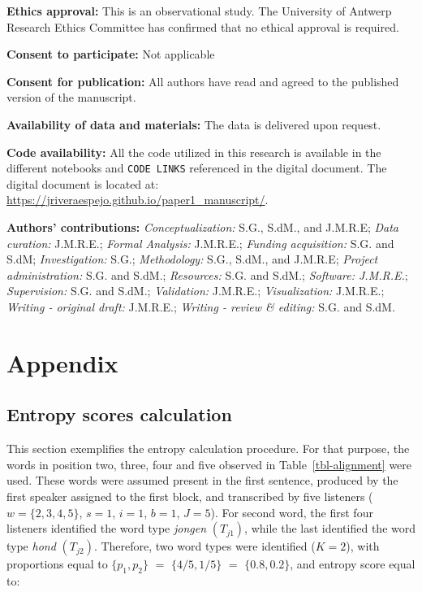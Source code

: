 \documentclass[
  authoryear,
  preprint,
  1p]{elsarticle}
\begin{document}
\textbf{Ethics approval:} This is an observational study. The University
of Antwerp Research Ethics Committee has confirmed that no ethical
approval is required.

\textbf{Consent to participate:} Not applicable

\textbf{Consent for publication:} All authors have read and agreed to
the published version of the manuscript.

\textbf{Availability of data and materials:} {The data is delivered upon
request.}

\textbf{Code availability:} {All the code utilized in this research is
available in the different notebooks and \texttt{CODE\ LINKS} referenced
in the digital document. The digital document is located at:}
\url{https://jriveraespejo.github.io/paper1_manuscript/}.

\textbf{Authors' contributions:} \emph{Conceptualization:} S.G., S.dM.,
and J.M.R.E; \emph{Data curation:} J.M.R.E.; \emph{Formal Analysis:}
J.M.R.E.; \emph{Funding acquisition:} S.G. and S.dM;
\emph{Investigation:} S.G.; \emph{Methodology:} S.G., S.dM., and
J.M.R.E; \emph{Project administration:} S.G. and S.dM.;
\emph{Resources:} S.G. and S.dM.; \emph{Software: J.M.R.E.};
\emph{Supervision:} S.G. and S.dM.; \emph{Validation:} J.M.R.E.;
\emph{Visualization:} J.M.R.E.; \emph{Writing - original draft:}
J.M.R.E.; \emph{Writing - review \& editing:} S.G. and S.dM.

\newpage{}

\section{Appendix}\label{sec-appendix}

\subsection{Entropy scores calculation}\label{sec-appA}

This section exemplifies the entropy calculation procedure. {For that
purpose, the words in position two, three, four and five observed in
Table~\ref{tbl-alignment} were used. These words were assumed present in
the first sentence, produced by the first speaker assigned to the first
block, and transcribed by five listeners (\(w=\{2,3,4,5\}\), \(s=1\),
\(i=1\), \(b=1\), \(J=5\)). For second word,} the first four listeners
identified the word type \emph{jongen} \((T_{j1})\), while the last
identified the word type \emph{hond} \((T_{j2})\). Therefore, two word
types were identified (\(K=2\)), with proportions equal to
\(\{ p_{1}, p_{2} \}\) \(=\) \(\{ 4/5, 1/5 \}\) \(=\)
\(\{ 0.8, 0.2 \}\), and entropy score equal to:
\end{document}
